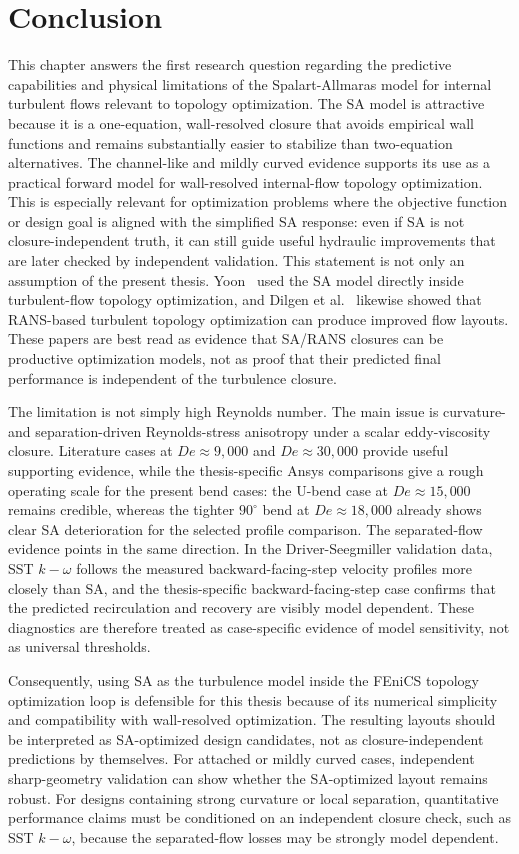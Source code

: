 \section{Conclusion}
This chapter answers the first research question regarding the predictive capabilities and physical limitations of the Spalart-Allmaras model for internal turbulent flows relevant to topology optimization. The SA model is attractive because it is a one-equation, wall-resolved closure that avoids empirical wall functions and remains substantially easier to stabilize than two-equation alternatives. The channel-like and mildly curved evidence supports its use as a practical forward model for wall-resolved internal-flow topology optimization. This is especially relevant for optimization problems where the objective function or design goal is aligned with the simplified SA response: even if SA is not closure-independent truth, it can still guide useful hydraulic improvements that are later checked by independent validation. This statement is not only an assumption of the present thesis. Yoon~\cite{Yoon2016} used the SA model directly inside turbulent-flow topology optimization, and Dilgen et al.~\cite{Dilgen2018} likewise showed that RANS-based turbulent topology optimization can produce improved flow layouts. These papers are best read as evidence that SA/RANS closures can be productive optimization models, not as proof that their predicted final performance is independent of the turbulence closure.

The limitation is not simply high Reynolds number. The main issue is curvature- and separation-driven Reynolds-stress anisotropy under a scalar eddy-viscosity closure. Literature cases at $De \approx 9,000$ and $De \approx 30,000$ provide useful supporting evidence, while the thesis-specific Ansys comparisons give a rough operating scale for the present bend cases: the U-bend case at $De \approx 15,000$ remains credible, whereas the tighter $90^\circ$ bend at $De \approx 18,000$ already shows clear SA deterioration for the selected profile comparison. The separated-flow evidence points in the same direction. In the Driver-Seegmiller validation data, SST $k-\omega$ follows the measured backward-facing-step velocity profiles more closely than SA, and the thesis-specific backward-facing-step case confirms that the predicted recirculation and recovery are visibly model dependent. These diagnostics are therefore treated as case-specific evidence of model sensitivity, not as universal thresholds.

Consequently, using SA as the turbulence model inside the FEniCS topology optimization loop is defensible for this thesis because of its numerical simplicity and compatibility with wall-resolved optimization. The resulting layouts should be interpreted as SA-optimized design candidates, not as closure-independent predictions by themselves. For attached or mildly curved cases, independent sharp-geometry validation can show whether the SA-optimized layout remains robust. For designs containing strong curvature or local separation, quantitative performance claims must be conditioned on an independent closure check, such as SST $k-\omega$, because the separated-flow losses may be strongly model dependent.
